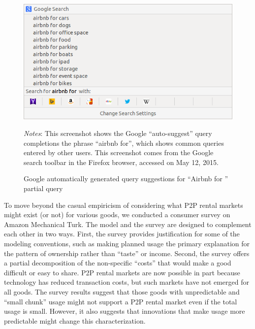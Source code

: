 \documentclass[11pt]{article}
\begin{document}
\begin{figure}
\centering 
\caption{Google automatically generated query suggestions for ``Airbnb for '' partial query}
\label{fig:auto} 
\begin{minipage}{0.70 \linewidth}
  \includegraphics[width = \linewidth]{./images/airbnb_for_x.png} \\
  \begin{footnotesize}
  \emph{Notes}: This screenshot shows the Google ``auto-suggest'' query completions the phrase ``airbnb for'', which shows common queries entered by other users.
  This screenshot comes from the Google search toolbar in the Firefox browser, accessed on May 12, 2015.
  \end{footnotesize}
\end{minipage}
\end{figure} 

To move beyond the casual empiricism of considering what P2P rental markets might exist (or not) for various goods, we conducted a consumer survey on Amazon Mechanical Turk. 
The model and the survey are designed to complement each other in two ways. 
First, the survey provides justification for some of the modeling conventions, such as making planned usage the primary explanation for the pattern of ownership rather than ``taste'' or income. 
Second, the survey offers a partial decomposition of the non-specific ``costs'' that would make a good difficult or easy to share.  
P2P rental markets are now possible in part because technology has reduced transaction costs, but such markets have not emerged for all goods. 
The survey results suggest that those goods with unpredictable and ``small chunk'' usage might not support a P2P rental market even if the total usage is small. 
However, it also suggests that innovations that make usage more predictable might change this characterization.  
\end{document}
